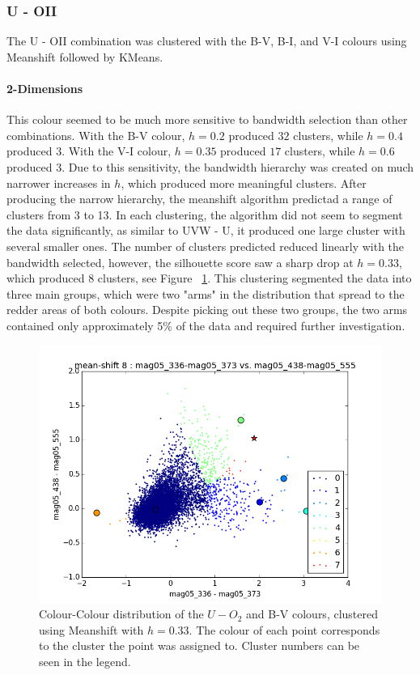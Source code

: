 \subsubsection{U - OII}
The U - OII combination was clustered with the B-V, B-I, and V-I colours using Meanshift followed by KMeans. %

\paragraph{2-Dimensions}

This colour seemed to be much more sensitive to bandwidth selection than other combinations.
With the B-V colour, $h=0.2$ produced $32$ clusters, while $h=0.4$ produced $3$. With the V-I colour, $h=0.35$ produced $17$ clusters, while $h=0.6$ produced $3$.
Due to this sensitivity, the bandwidth hierarchy was created on much narrower increases in $h$, which produced more meaningful clusters.
After producing the narrow hierarchy, the meanshift algorithm predictad a range of clusters from 3 to 13.
In each clustering, the algorithm did not seem to segment the data significantly, as similar to UVW - U, it produced one large cluster with several smaller ones.
The number of clusters predicted reduced linearly with the bandwidth selected, however, the silhouette score saw a sharp drop at $h = 0.33$, which produced 8 clusters, see Figure ~\ref{fig:UOIIMS}. 
This clustering segmented the data into three main groups, which were two "arms" in the distribution that spread to the redder areas of both colours.
Despite picking out these two groups, the two arms contained only approximately 5\% of the data and required further investigation. 

\begin{figure}
\centering
\includegraphics[width=\linewidth]{figs/meanshift_color_8cl_mag05_336-mag05_373vsmag05_438-mag05_555}
\caption{Colour-Colour distribution of the $U-O_{2}$ and B-V colours, clustered using Meanshift with $h=0.33$. The colour of each point corresponds to the cluster the point was assigned to. Cluster numbers can be seen in the legend.}
\label{fig:UOIIMS}
\end{figure}


